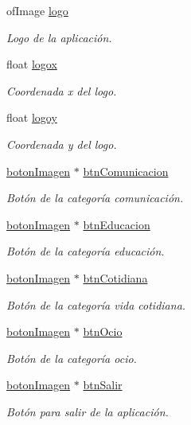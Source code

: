 \begin{DoxyCompactItemize}
of\+Image \hyperlink{classmenu_principal_aa5ec7fdf5031285aab08c58e0fecbd82}{logo}
\begin{DoxyCompactList}\small\item\em Logo de la aplicación. \end{DoxyCompactList}\item 
float \hyperlink{classmenu_principal_aca0ebae92aafb9026c9aace3e23463fb}{logox}
\begin{DoxyCompactList}\small\item\em Coordenada x del logo. \end{DoxyCompactList}\item 
float \hyperlink{classmenu_principal_a1f1f6764a1253e7fa12f9cee448f29b9}{logoy}
\begin{DoxyCompactList}\small\item\em Coordenada y del logo. \end{DoxyCompactList}\item 
\hyperlink{classboton_imagen}{boton\+Imagen} $\ast$ \hyperlink{classmenu_principal_a731ca834c77af1bade609b3bc28ab02c}{btn\+Comunicacion}
\begin{DoxyCompactList}\small\item\em Botón de la categoría comunicación. \end{DoxyCompactList}\item 
\hyperlink{classboton_imagen}{boton\+Imagen} $\ast$ \hyperlink{classmenu_principal_ab26a999803f322e9c9f05acd53125a8c}{btn\+Educacion}
\begin{DoxyCompactList}\small\item\em Botón de la categoría educación. \end{DoxyCompactList}\item 
\hyperlink{classboton_imagen}{boton\+Imagen} $\ast$ \hyperlink{classmenu_principal_a9c27d54b3333900acd941d889019ba1a}{btn\+Cotidiana}
\begin{DoxyCompactList}\small\item\em Botón de la categoría vida cotidiana. \end{DoxyCompactList}\item 
\hyperlink{classboton_imagen}{boton\+Imagen} $\ast$ \hyperlink{classmenu_principal_a488846721d51f37a0ce23bb19372c0b1}{btn\+Ocio}
\begin{DoxyCompactList}\small\item\em Botón de la categoría ocio. \end{DoxyCompactList}\item 
\hyperlink{classboton_imagen}{boton\+Imagen} $\ast$ \hyperlink{classmenu_principal_a9415d04ae2ac0a7927c32c95acdcb9ca}{btn\+Salir}
\begin{DoxyCompactList}\small\item\em Botón para salir de la aplicación. \end{DoxyCompactList}\end{DoxyCompactItemize}
